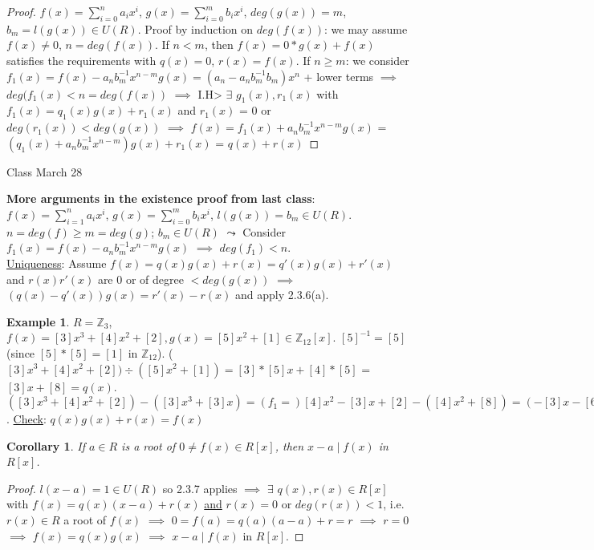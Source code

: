 \documentclass[11pt]{article}
\newtheorem{cor}[thm]{Corollary}
\theoremstyle{definition}
\newtheorem{example}[thm]{Example}
\numberwithin{equation}{section}
\newcommand{\Z}{\mathbb{Z}}
\begin{document}
\begin{proof}
$f(x) = \sum_{i=0}^{n}a_{i}x^{i}$, $g(x) = \sum_{i=0}^{m}b_{i}x^{i}$, $deg(g(x)) = m$, $b_{m} = l(g(x)) \in U(R)$. Proof by induction on $deg(f(x))$: we may assume $f(x) \neq 0$, $n = deg(f(x))$. If $n < m$, then $f(x) = 0*g(x) + f(x)$ satisfies the requirements with $q(x) = 0$, $r(x) = f(x)$. If $n \geq m$: we consider $f_{1}(x) = f(x) - a_{n}b_{m}^{-1}x^{n-m}g(x) = (a_{n}-a_{n}b_{m}^{-1}b_{m})x^{n}$ + lower terms $\implies$ $deg(f_{1}(x) < n = deg(f(x))$ $\implies$ I.H> $\exists$ $g_{1}(x), r_{1}(x)$ with $f_{1}(x) = q_{1}(x)g(x) + r_{1}(x)$ and $r_{1}(x)$ = 0 or $deg(r_{1}(x)) < deg(g(x))$ $\implies$ $f(x) = f_{1}(x) + a_{n}b_{m}^{-1}x^{n-m}g(x)$ = $(q_{1}(x) + a_{n}b_{m}^{-1}x^{n-m})g(x) + r_{1}(x)$ = $q(x) + r(x)$
\end{proof}

\begin{center}
{\sf\LARGE Class March 28}
\end{center}

\textbf{More arguments in the existence proof from last class}: $f(x) = \sum_{i=1}^{n}a_{i}x^{i}$, $g(x) = \sum_{i=0}^{m}b_{i}x^{i}$, $l(g(x)) = b_{m} \in U(R)$. $n = deg(f) \geq m = deg(g)$; $b_{m} \in U(R)$ $\leadsto$ Consider $f_{1}(x) = f(x) - a_{n}b_{m}^{-1}x^{n-m}g(x)$ $\implies$ $deg(f_{1}) < n$.\\
\underline{Uniqueness}: Assume $f(x) = q(x)g(x) + r(x) = q'(x)g(x) + r'(x)$ and $r(x)r'(x)$ are $0$ or of degree $< deg(g(x))$ $\implies$ $(q(x) - q'(x))g(x) = r'(x) - r(x)$ and apply 2.3.6(a).

\begin{example}
$R = \Z_{3}$, $f(x) = [3]x^{3} + [4]x^{2} + [2], g(x) = [5]x^{2}+[1] \in \Z_{12}[x]$. $[5]^{-1} = [5]$ (since $[5]*[5] = [1]$ in $\Z_{12}$). ($[3]x^{3}+[4]x^{2} + [2]) \div ([5]x^{2} + [1]) = [3]*[5]x + [4]*[5]$ = $[3]x + [8] = q(x)$.\\
$([3]x^{3} + [4]x^{2} + [2]) - ([3]x^{3}+[3]x) = (f_{1} = ) [4]x^{2} - [3]x + [2] - ([4]x^{2} + [8]) = (-[3]x - [6]) = [9]x + [6] = r(x)$. \underline{Check}: $q(x)g(x) + r(x) = f(x)$
\end{example}

\begin{cor}
If $a \in R$ is a root of $0 \neq f(x) \in R[x]$, then $x - a \mid f(x)$ in $R[x]$.
\end{cor}

\begin{proof}
$l(x-a) = 1 \in U(R)$ so 2.3.7 applies $\implies$ $\exists$ $q(x), r(x) \in R[x]$ with $f(x) = q(x)(x-a) + r(x)$ \underline{and} $r(x) = 0$ or $deg(r(x)) < 1$, i.e. $r(x) \in R$ a root of $f(x)$ $\implies$ $0 = f(a) = q(a)(a-a) + r = r$ $\implies$ $r = 0$ $\implies$ $f(x) = q(x)g(x)$ $\implies$ $x -a \mid f(x)$ in $R[x]$.
\end{proof}
\end{document}
